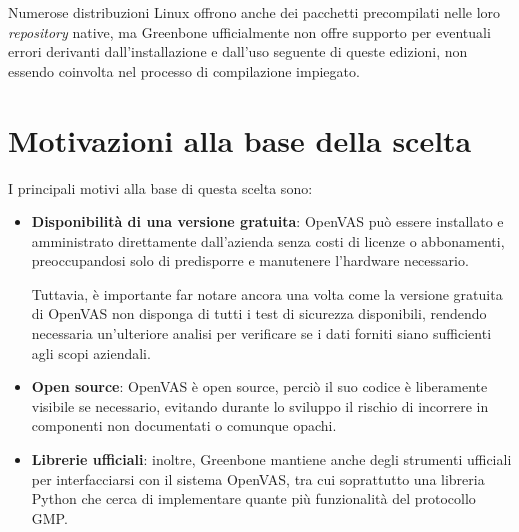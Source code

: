 Numerose distribuzioni Linux offrono anche dei pacchetti precompilati nelle loro \emph{repository} native, ma Greenbone ufficialmente non offre supporto per eventuali errori derivanti dall'installazione e dall'uso seguente di queste edizioni, non essendo coinvolta nel processo di compilazione impiegato.

\section{Motivazioni alla base della scelta}
I principali motivi alla base di questa scelta sono:
\begin{itemize}
    \item \textbf{Disponibilità di una versione gratuita}: OpenVAS può essere installato e amministrato direttamente dall'azienda senza costi di licenze o abbonamenti, preoccupandosi solo di predisporre e manutenere l'hardware necessario.
    
    Tuttavia, è importante far notare ancora una volta come la versione gratuita di OpenVAS non disponga di tutti i test di sicurezza disponibili, rendendo necessaria un'ulteriore analisi per verificare se i dati forniti siano sufficienti agli scopi aziendali.

    \item \textbf{Open source}: OpenVAS è open source, perciò il suo codice è liberamente visibile se necessario, evitando durante lo sviluppo il rischio di incorrere in componenti non documentati o comunque opachi.
    
    \item \textbf{Librerie ufficiali}: inoltre, Greenbone mantiene anche degli strumenti ufficiali per interfacciarsi con il sistema OpenVAS, tra cui soprattutto una libreria Python che cerca di implementare quante più funzionalità del protocollo GMP.
\end{itemize}